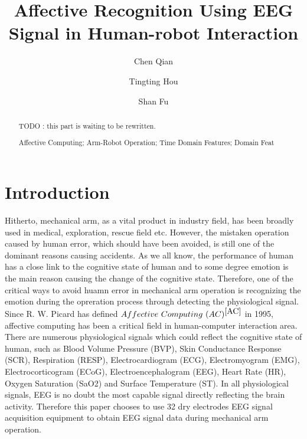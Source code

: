 \documentclass[runningheads,a4paper]{llncs}
\newcommand{\keywords}[1]{\par\addvspace\baselineskip
\noindent\keywordname\enspace\ignorespaces#1}
\begin{document}
\mainmatter

\title{ Affective Recognition Using EEG Signal in Human-robot Interaction }

\author{Chen Qian\and Tingting Hou\and Shan Fu }


\maketitle
\begin{abstract}
TODO : this part is waiting to be rewritten.
\keywords{Affective Computing; Arm-Robot Operation; Time Domain Features;
Domain Feat}
\end{abstract}

\section{Introduction}
Hitherto, mechanical arm, as a vital product in industry field, has been broadly
used in medical, exploration, rescue field etc. However, the mistaken operation
caused by human error, which should have been avoided, is still one of the
dominant reasons causing accidents. As we all know, the performance of human has a
close link to the cognitive state of human and to some degree emotion is the
main reason causing the change of the cognitive state. Therefore, one of the
critical ways to avoid huamn error in mechanical arm operation is recognizing
the emotion during the opreration process through detecting the physiological
signal. Since R. W. Picard has defined $Affective\ Computing\ (AC)^{\cite{AC}}$
in 1995, affective computing has been a critical field in human-computer
interaction area. There are numerous physiological signals which could reflect
the cognitive state of human, such as Blood Volume Pressure (BVP), Skin Conductance
Response (SCR), Respiration (RESP), Electrocardiogram (ECG), Electromyogram (EMG),
Electrocorticogram (ECoG), Electroencephalogram (EEG), Heart Rate (HR), Oxygen
Saturation (SaO2) and Surface Temperature (ST)\cite{KR}. In all physiological
signals, EEG is no doubt the most capable signal directly reflecting the brain
activity. Therefore this paper chooses to use 32 dry electrodes EEG signal acquisition
equipment to obtain EEG signal data during mechanical arm operation.
\end{document}
